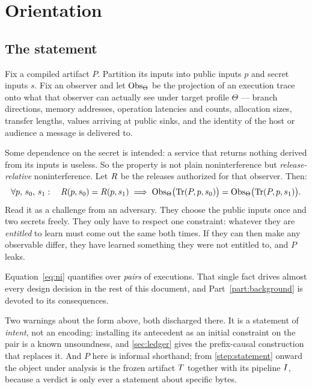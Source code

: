 \section{Orientation}
\label{part:orientation}

\subsection{The statement}

Fix a compiled artifact $P$. Partition its inputs into public inputs $p$ and
secret inputs $s$. Fix an observer and let $\mathrm{Obs}_\Theta$ be the projection of an
execution trace onto what that observer can actually see under target profile
$\Theta$ --- branch directions, memory addresses, operation latencies and
counts, allocation sizes, transfer lengths, values arriving at public sinks, and
the identity of the host or audience a message is delivered to.

Some dependence on the secret is intended: a service that returns nothing
derived from its inputs is useless. So the property is not plain
noninterference but \emph{release-relative} noninterference. Let $R$ be the
releases authorized for that observer. Then:
%
\begin{equation}
\label{eq:ni}
\forall p,\, s_0,\, s_1 :\quad
  R(p,s_0) = R(p,s_1)
  \;\Longrightarrow\;
  \mathrm{Obs}_\Theta\bigl(\mathrm{Tr}(P,p,s_0)\bigr) = \mathrm{Obs}_\Theta\bigl(\mathrm{Tr}(P,p,s_1)\bigr).
\end{equation}
%
Read it as a challenge from an adversary. They choose the public inputs once and
two secrets freely. They only have to respect one constraint: whatever they are
\emph{entitled} to learn must come out the same both times. If they can then
make any observable differ, they have learned something they were not entitled
to, and $P$ leaks.

\begin{remark}
Equation~\eqref{eq:ni} quantifies over \emph{pairs} of executions. That single
fact drives almost every design decision in the rest of this document, and
Part~\ref{part:background} is devoted to its consequences.

Two warnings about the form above, both discharged there. It is a statement of
\emph{intent}, not an encoding: installing its antecedent as an initial
constraint on the pair is a known unsoundness, and \cref{sec:ledger} gives the
prefix-causal construction that replaces it. And $P$ here is informal shorthand;
from \cref{step:statement} onward the object under analysis is the frozen
artifact $T$ together with its pipeline $I$, because a verdict is
only ever a statement about specific bytes.
\end{remark}

